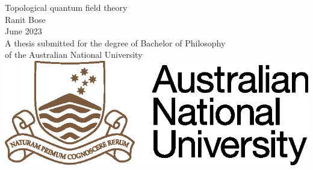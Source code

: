 \begin{titlepage}
\begin{center}

\vspace*{\fill} \Huge
                        Topological quantum field theory
\\
\vfill\vfill\Large
                          Ranit Bose
\\
\vfill\vfill
                          June 2023
\\
\vfill\vfill \normalsize
         A thesis submitted for the degree of Bachelor of Philosophy\\
         of the Australian National University
\vfill
         \includegraphics{ANU.eps}

\end{center}

\end{titlepage}
